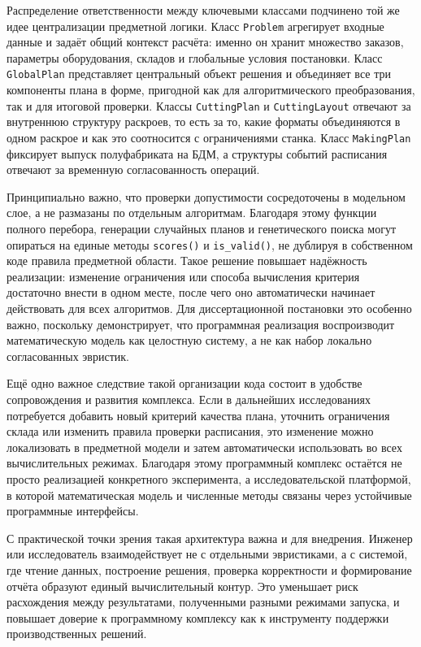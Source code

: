 Распределение ответственности между ключевыми классами подчинено той же идее централизации предметной логики. Класс \texttt{Problem} агрегирует входные данные и задаёт общий контекст расчёта: именно он хранит множество заказов, параметры оборудования, складов и глобальные условия постановки. Класс \texttt{GlobalPlan} представляет центральный объект решения и объединяет все три компоненты плана в форме, пригодной как для алгоритмического преобразования, так и для итоговой проверки. Классы \texttt{CuttingPlan} и \texttt{CuttingLayout} отвечают за внутреннюю структуру раскроев, то есть за то, какие форматы объединяются в одном раскрое и как это соотносится с ограничениями станка. Класс \texttt{MakingPlan} фиксирует выпуск полуфабриката на БДМ, а структуры событий расписания отвечают за временную согласованность операций.

Принципиально важно, что проверки допустимости сосредоточены в модельном слое, а не размазаны по отдельным алгоритмам. Благодаря этому функции полного перебора, генерации случайных планов и генетического поиска могут опираться на единые методы \texttt{scores()} и \texttt{is\_valid()}, не дублируя в собственном коде правила предметной области. Такое решение повышает надёжность реализации: изменение ограничения или способа вычисления критерия достаточно внести в одном месте, после чего оно автоматически начинает действовать для всех алгоритмов. Для диссертационной постановки это особенно важно, поскольку демонстрирует, что программная реализация воспроизводит математическую модель как целостную систему, а не как набор локально согласованных эвристик.

Ещё одно важное следствие такой организации кода состоит в удобстве сопровождения и развития комплекса. Если в дальнейших исследованиях потребуется добавить новый критерий качества плана, уточнить ограничения склада или изменить правила проверки расписания, это изменение можно локализовать в предметной модели и затем автоматически использовать во всех вычислительных режимах. Благодаря этому программный комплекс остаётся не просто реализацией конкретного эксперимента, а исследовательской платформой, в которой математическая модель и численные методы связаны через устойчивые программные интерфейсы.

С практической точки зрения такая архитектура важна и для внедрения. Инженер или исследователь взаимодействует не с отдельными эвристиками, а с системой, где чтение данных, построение решения, проверка корректности и формирование отчёта образуют единый вычислительный контур. Это уменьшает риск расхождения между результатами, полученными разными режимами запуска, и повышает доверие к программному комплексу как к инструменту поддержки производственных решений.

